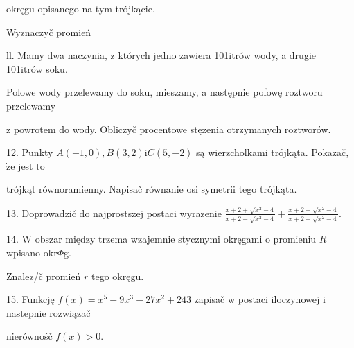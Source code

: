 \documentclass[a4paper,12pt]{article}
\begin{document}
okręgu opisanego na tym trójkącie.

Wyznaczyč promień

ll. Mamy dwa naczynia, z których jedno zawiera 101itrów wody, a drugie 101itrów soku.

Polowe wody przelewamy do soku, mieszamy, a następnie pofowę roztworu przelewamy

z powrotem do wody. Obliczyč procentowe stęzenia otrzymanych roztworów.

12. Punkty $A(-1,0), B(3,2) \mathrm{i} C(5,-2)$ są wierzcholkami trójkąta. Pokazač, $\dot{\mathrm{z}}\mathrm{e}$ jest to

trójkąt równoramienny. Napisač równanie osi symetrii tego trójkąta.

13. Doprowadzič do najprostszej postaci wyrazenie $\displaystyle \frac{x+2+\sqrt{x^{2}-4}}{x+2-\sqrt{x^{2}-4}}+\frac{x+2-\sqrt{x^{2}-4}}{x+2+\sqrt{x^{2}-4}}.$

14. $\mathrm{W}$ obszar między trzema wzajemnie stycznymi okręgami o promieniu $R$ wpisano $\mathrm{o}\mathrm{k}\mathrm{r}\Phi \mathrm{g}.$

Znalez/č promień $r$ tego okręgu.

15. Funkcję $f(x)=x^{5}-9x^{3}-27x^{2}+243$ zapisač w postaci iloczynowej i nastepnie rozwiązač

nierównośč $f(x)>0.$
\end{document}
